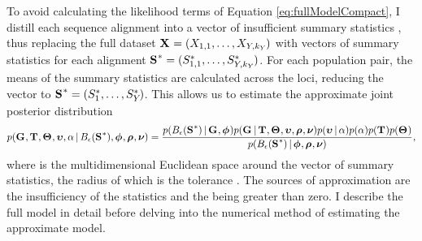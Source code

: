 \begin{linenomath}
To avoid calculating the likelihood terms of Equation \ref{eq:fullModelCompact},
I distill each sequence alignment \alignment{}{} into a vector of insufficient
summary statistics \alignmentSS{}{}, thus replacing the full dataset
$\alignmentVector = (\alignment{1}{1}, \ldots,
    \alignment{\npairs{}}{\nloci{\npairs{}}})$
with vectors of summary statistics for each alignment
$\ssVectorObs = (\alignmentSSObs{1}{1}, \ldots,
    \alignmentSSObs{\npairs{}}{\nloci{\npairs{}}})$.
For each population pair, the means of the summary statistics are calculated
across the \nloci{} loci, reducing the vector to
$\ssVectorObs = (\alignmentSSObs{1}{}, \ldots,
    \alignmentSSObs{\npairs{}}{})$.
This allows us to estimate the approximate joint posterior distribution
{\small
\begin{equation}
    p(\geneTreeVector, \divTimeMapVector, \demographicParamVector, 
    \locusMutationRateScalarVector, \locusRateHetShapeParameter \given
    \ssSpace, \hkyModelVector, \ploidyScalarVector,
    \mutationRateScalarConstantVector) =
    \frac{p(\ssSpace \given \geneTreeVector, \hkyModelVector)
        p(\geneTreeVector \given \divTimeMapVector, \demographicParamVector,
        \locusMutationRateScalarVector, \ploidyScalarVector,
        \mutationRateScalarConstantVector)
        p(\locusMutationRateScalarVector \given \locusRateHetShapeParameter)
        p(\locusRateHetShapeParameter)
        p(\divTimeMapVector)
        p(\demographicParamVector)}{
        p(\ssSpace \given \hkyModelVector, \ploidyScalarVector,
        \mutationRateScalarConstantVector)},
    \label{eq:approxModelCompact}
\end{equation}
}
where \ssSpace is the multidimensional Euclidean space around the vector of
summary statistics, the radius of which is the tolerance \tol.
The sources of approximation are the insufficiency of the statistics and the
\tol being greater than zero.
I describe the full model in detail before delving into the numerical
method of estimating the approximate model.
\end{linenomath}

